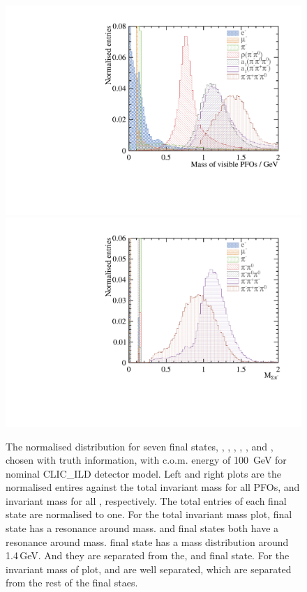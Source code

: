 \documentclass[a4paper,11pt]{article}
\begin{document}
\begin{figure}[htbp]
\centering %
\includegraphics[width=.45\textwidth]{plots/var/mVis_100GeV_improved_zoom}
\qquad
\includegraphics[width=.45\textwidth]{plots/var/mPionCharge_100GeV_improved_zoom} 

\caption{\label{fig:hadrons} The normalised distribution for seven final states, \Pem\APnue\Pnu, \Pmuon\APnum\Pnut, \Ppiminus\Pnut, \Pphoton\Pnut, \Pphoton\Pnut, \Ppiminus\Pnut and \Pphoton\Pnut, chosen with truth information,  with c.o.m. energy of 100 \,GeV for nominal CLIC\_ILD detector model. Left and right plots are the normalised entires against the total invariant mass for all PFOs, and invariant mass for all \Ppipm, respectively. The total entries of each final state are normalised to one. For the total invariant mass plot, \Pphoton\Pnut final state has a resonance around \Prho mass. \Pphoton\Pnut and \Ppiminus\Pnut final states both have a resonance around \Pai mass.  \Pphoton\Pnut final state has a mass distribution around 1.4\,GeV. And they are separated from the\Pem\APnue\Pnu, \Pmuon\APnum\Pnut and \Ppiminus\Pnut final state.  For the invariant mass of \Ppipm plot, \Ppiminus\Pnut and \Pphoton\Pnut are well separated, which are separated from the rest of the final staes.
}
\end{figure}
\end{document}
